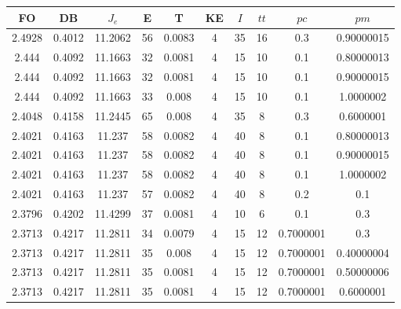 \begin{table}[h!]
    \footnotesize
    \begin{center}
        \begin{tabular}{|c|c|c|c|c|c|c|c|c|c|}
        \hline
            {\bf FO} & {\bf DB} & $J_e$ & {\bf E} & {\bf T} & {\bf KE} & $I$ & $tt$ & $pc$ & $pm$ \\
        \hline
        \hline
            2.4928 & 0.4012  & 11.2062 & 56 & 0.0083 & 4 & 35 & 16 & 0.3 & 0.90000015\\
        \hline
        \hline
            2.444 & 0.4092  & 11.1663 & 32 & 0.0081 & 4 & 15 & 10 & 0.1 & 0.80000013\\
        \hline
        \hline
            2.444 & 0.4092  & 11.1663 & 32 & 0.0081 & 4 & 15 & 10 & 0.1 & 0.90000015\\
        \hline
        \hline
            2.444 & 0.4092  & 11.1663 & 33 & 0.008 & 4 & 15 & 10 & 0.1 & 1.0000002\\
        \hline
        \hline
            2.4048 & 0.4158  & 11.2445 & 65 & 0.008 & 4 & 35 & 8 & 0.3 & 0.6000001\\
        \hline
        \hline
            2.4021 & 0.4163  & 11.237 & 58 & 0.0082 & 4 & 40 & 8 & 0.1 & 0.80000013\\
        \hline
        \hline
            2.4021 & 0.4163  & 11.237 & 58 & 0.0082 & 4 & 40 & 8 & 0.1 & 0.90000015\\
        \hline
        \hline
            2.4021 & 0.4163  & 11.237 & 58 & 0.0082 & 4 & 40 & 8 & 0.1 & 1.0000002\\
        \hline
        \hline
            2.4021 & 0.4163  & 11.237 & 57 & 0.0082 & 4 & 40 & 8 & 0.2 & 0.1\\
        \hline
        \hline
            2.3796 & 0.4202  & 11.4299 & 37 & 0.0081 & 4 & 10 & 6 & 0.1 & 0.3\\
        \hline
        \hline
            2.3713 & 0.4217  & 11.2811 & 34 & 0.0079 & 4 & 15 & 12 & 0.7000001 & 0.3\\
        \hline
        \hline
            2.3713 & 0.4217  & 11.2811 & 35 & 0.008 & 4 & 15 & 12 & 0.7000001 & 0.40000004\\
        \hline
        \hline
            2.3713 & 0.4217  & 11.2811 & 35 & 0.0081 & 4 & 15 & 12 & 0.7000001 & 0.50000006\\
        \hline
        \hline
            2.3713 & 0.4217  & 11.2811 & 35 & 0.0081 & 4 & 15 & 12 & 0.7000001 & 0.6000001\\
        \hline
        \hline

\end{tabular}
\end{center}
\end{table}
